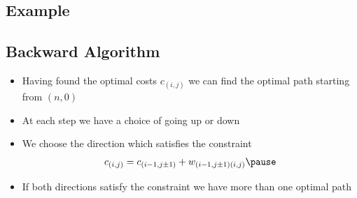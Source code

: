 
\begin{slide}
\section[-2]{Example}
\pb
\begin{center}
  \pause
\end{center}
\end{slide}


\begin{slide}
\section{Backward Algorithm}

\begin{PauseHighLight}
  \begin{itemize}
  \item Having found the optimal costs $c_{(i,j)}$ we can find the
    optimal path starting from $(n,0)$\pause
  \item At each step we have a choice of going up or down\pause
  \item We choose the direction which satisfies the constraint
    \begin{align*}
      c_{(i,j)} = c_{(i-1,j\pm1)}+w_{(i-1,j\pm1)(i,j)}\pause
    \end{align*}
  \item If both directions satisfy the constraint we have more than one
    optimal path\pause
  \end{itemize}
\end{PauseHighLight}

\end{slide}


